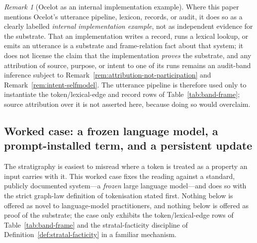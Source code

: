 \documentclass[11pt,a4paper]{article}
\theoremstyle{remark}\newtheorem{remark}[definition]{Remark}
\begin{document}
\begin{remark}[Ocelot as an internal implementation example]\label{rem:ocelot-caveat}
Where this paper mentions Ocelot's utterance pipeline, lexicon, records, or audit,
it does so as a clearly labelled \emph{internal implementation example}, not as
independent evidence for the substrate. That an implementation writes a record,
runs a lexical lookup, or emits an utterance is a substrate and frame-relation
fact about that system; it does not license the claim that the implementation
\emph{proves} the substrate, and any attribution of source, purpose, or intent to
one of its runs remains an audit-band inference subject to
Remark~\ref{rem:attribution-not-participation} and
Remark~\ref{rem:intent-selfmodel}. The utterance pipeline is therefore used only
to instantiate the token/lexical-edge and record rows of
Table~\ref{tab:band-frame}; source attribution over it is not asserted here,
because doing so would overclaim.
\end{remark}

\subsection{Worked case: a frozen language model, a prompt-installed term, and a persistent update}\label{sec:llm-worked-case}

The stratigraphy is easiest to misread where a token is treated as a property an
input carries with it. This worked case fixes the reading against a standard,
publicly documented system---a \emph{frozen} large language model---and does so
with the strict graph-law definition of tokenisation stated first. Nothing below
is offered as novel to language-model practitioners, and nothing below is offered
as proof of the substrate; the case only exhibits the token/lexical-edge rows of
Table~\ref{tab:band-frame} and the stratal-facticity discipline of
Definition~\ref{def:stratal-facticity} in a familiar mechanism.
\end{document}
